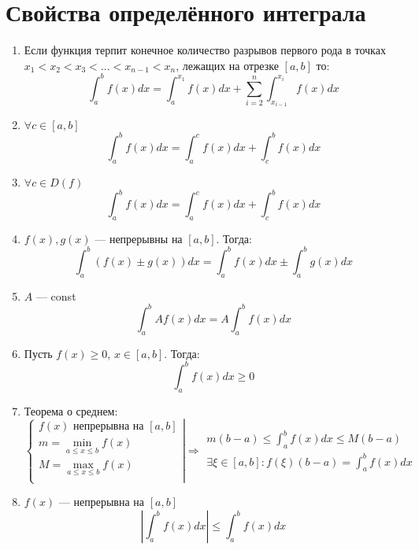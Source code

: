 \documentclass[12pt]{article}
\begin{document}
\section{Свойства определённого интеграла}
\begin{enumerate}
    \item Если функция терпит конечное количество разрывов первого рода в точках $x_1 < x_2 < x_3 < ... < x_{n - 1} < x_n$, лежащих на отрезке $[a, b]$ то:
          \[
              \int_a^b f(x)dx = \int_a^{x_1} f(x)dx + \sum^{n}_{i = 2} \int_{x_{i - 1}}^{x_i}f(x)dx
          \]
    \item $\forall c \in [a, b]$
          \[
              \int_{a}^{b}f(x)dx = \int_a^cf(x)dx + \int_c^bf(x)dx
          \]
    \item $\forall c \in D(f)$
          \[
              \int_{a}^{b}f(x)dx = \int_a^cf(x)dx + \int_c^bf(x)dx
          \]
    \item $f(x), g(x)$ — непрерывны на $[a, b]$. Тогда:
          \[
              \int_a^b (f(x) \pm g(x))dx = \int_a^b f(x)dx \pm \int_a^b g(x)dx
          \]
    \item $A$ — const
          \[
              \int_a^b Af(x)dx = A\int_a^b f(x)dx
          \]
    \item Пусть $f(x) \geq 0$, $x \in [a, b]$. Тогда:
          \[
              \int_a^b f(x)dx \geq 0
          \]
    \item Теорема о среднем:
          \[
              \left\{\begin{array}{l}
                  \displaystyle f(x) \text{ непрерывна на } [a, b] \\
                  \displaystyle m = \min_{a \leq x \leq b} f(x)    \\
                  \displaystyle M = \max_{a \leq x \leq b} f(x)    \\
              \end{array}\right|
              \Rightarrow
              \begin{array}{l}
                  \displaystyle m(b - a) \leq \int_a^b f(x)dx \leq M(b - a) \\
                  \displaystyle \exists \xi \in [a, b] : f(\xi)(b - a) = \int_a^b f(x)dx
              \end{array}
          \]
    \item $f(x)$ — непрерывна на $[a, b]$
          \[
              \left|\int_a^b f(x)dx \right| \leq \int_a^b f(x)dx
          \]
\end{enumerate}
\end{document}
